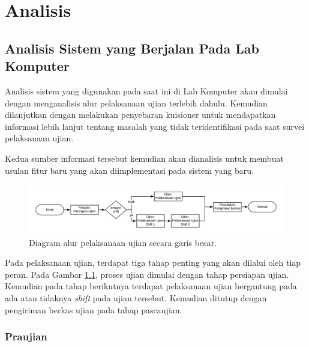 \chapter{Analisis}
\label{chap:analisis}

\section{Analisis Sistem yang Berjalan Pada Lab Komputer}
    
    Analisis sistem yang digunakan pada saat ini di Lab Komputer akan dimulai
    dengan menganalisis alur pelaksanaan ujian terlebih dahulu. Kemudian
    dilanjutkan dengan melakukan penyebaran kuisioner untuk mendapatkan
    informasi lebih lanjut tentang masalah yang tidak teridentifikasi pada saat
    survei pelaksanaan ujian.
    
    Kedua sumber informasi tersebut kemudian akan dianalisis untuk membuat
    usulan fitur baru yang akan diimplementasi pada sistem yang baru.


    \begin{figure}[H]
        \centering
        \includegraphics[width=0.75\paperwidth]{Gambar/flowchart/exam-flow-ujian.pdf}
        \caption{Diagram alur pelaksanaan ujian secara garis besar.}
        \label{fig:flowchart-exam-outline}
    \end{figure}
    
    Pada pelaksanaan ujian, terdapat tiga tahap penting yang
    akan dilalui oleh tiap peran. Pada Gambar \ref{fig:flowchart-exam-outline},
    proses ujian dimulai dengan tahap persiapan ujian. Kemudian pada tahap
    berikutnya terdapat pelaksanaan ujian bergantung pada ada atau tidaknya
    \textit{shift} pada ujian tersebut. Kemudian ditutup dengan pengiriman
    berkas ujian pada tahap pascaujian.
    
    \subsection{Praujian}
    
